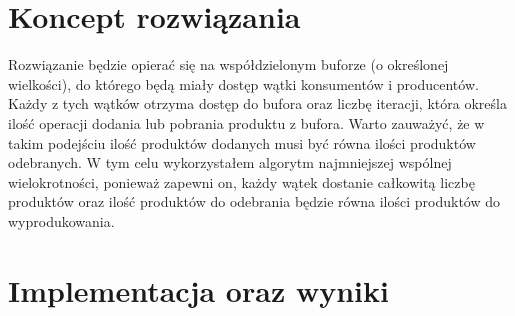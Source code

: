 \documentclass[12pt]{article}
\begin{document}
  
\section{Koncept rozwiązania}
Rozwiązanie będzie opierać się na współdzielonym buforze (o określonej wielkości), do którego będą miały dostęp wątki konsumentów i producentów. Każdy z tych wątków otrzyma dostęp do bufora oraz liczbę iteracji, która określa ilość operacji dodania lub pobrania produktu z bufora. Warto zauważyć, że w takim podejściu ilość produktów dodanych musi być równa ilości produktów odebranych. W tym celu wykorzystałem algorytm najmniejszej wspólnej wielokrotności, ponieważ zapewni on, każdy wątek dostanie całkowitą liczbę produktów oraz ilość produktów do odebrania będzie równa ilości produktów do wyprodukowania.


\section{Implementacja oraz wyniki}
\end{document}
